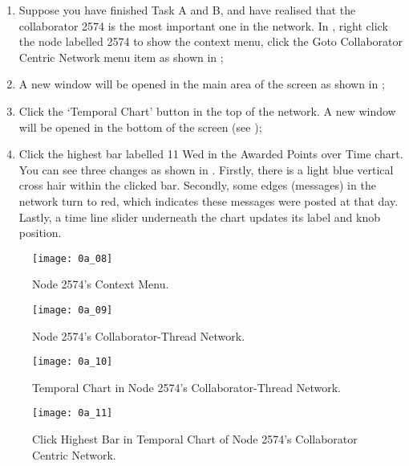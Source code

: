 \begin{enumerate}
	\item Suppose you have finished Task A and B, and have realised that the collaborator 2574 is the most important one in the network. In , right click the node labelled 2574 to show the context menu, click the Goto Collaborator Centric Network menu item as shown in ; \\
	\item A new window will be opened in the main area of the screen as shown in ; \\
	\item Click the `Temporal Chart' button in the top of the network. A new window will be opened in the bottom of the screen (see ); \\
	\item Click the highest bar labelled 11 Wed in the Awarded Points over Time chart. You can see three changes as shown in . Firstly, there is a light blue vertical cross hair within the clicked bar. Secondly, some edges (messages) in the network turn to red, which indicates these messages were posted at that day. Lastly, a time line slider underneath the chart updates its label and knob position.
\end{enumerate}

\begin{figure}[!htb]
  \centering
  \texttt{[image: 0a\_08]}
  \caption{Node 2574's Context Menu.}
  \label{Figure:0a_08}
\end{figure}

\begin{figure}[!htb]
  \centering
  \texttt{[image: 0a\_09]}
  \caption{Node 2574's Collaborator-Thread Network.}
  \label{Figure:0a_09}
\end{figure}

\begin{figure}[!htb]
  \centering
  \texttt{[image: 0a\_10]}
  \caption{Temporal Chart in Node 2574's Collaborator-Thread Network.}
  \label{Figure:0a_10}
\end{figure}

\begin{figure}[!htb]
  \centering
  \texttt{[image: 0a\_11]}
  \caption{Click Highest Bar in Temporal Chart of Node 2574's Collaborator Centric Network.}
  \label{Figure:0a_11}
\end{figure}

